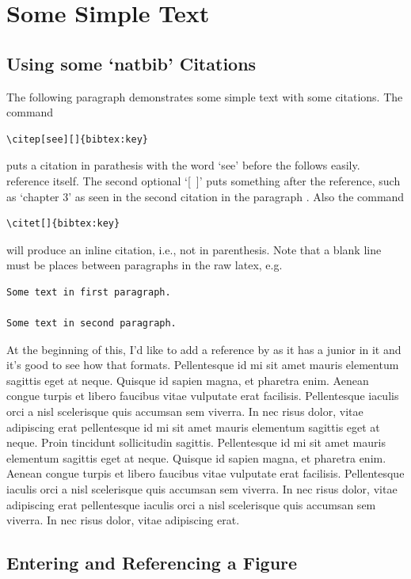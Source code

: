 \chapter{Some Simple Text}

\section{Using some `natbib' Citations}

The following paragraph demonstrates some simple text with some citations. The
command
\begin{verbatim}
\citep[see][]{bibtex:key}
\end{verbatim}
puts a citation in parathesis with the word `see' before the follows easily.
reference itself. The second optional `[~]' puts something after the reference,
such as `chapter 3' as seen \cite{Glover.2012} in the second citation in the paragraph \cite{Grainger.1994}. Also the
command \cite{Jenkins.2000}
\begin{verbatim}
\citet[]{bibtex:key}
\end{verbatim}
will produce an inline citation, i.e., not in parenthesis. Note that a blank
line must be places between paragraphs in the raw latex, e.g.
\begin{verbatim}
Some text in first paragraph.

Some text in second paragraph.
\end{verbatim}

At the beginning of this, I'd like to add a reference by
as it has a junior in it and it's good to see how that formats. Pellentesque id
mi sit amet mauris elementum sagittis eget at neque. Quisque id sapien magna, et
pharetra enim. Aenean congue turpis et libero faucibus vitae vulputate erat
facilisis. Pellentesque iaculis orci a nisl scelerisque quis accumsan sem
viverra. In nec risus dolor, vitae adipiscing erat
pellentesque id mi sit amet mauris elementum 
sagittis eget at neque. Proin tincidunt sollicitudin sagittis. Pellentesque id
mi sit amet mauris elementum sagittis eget at neque. Quisque id sapien magna, et
pharetra enim. Aenean congue turpis et libero faucibus vitae vulputate erat
facilisis. Pellentesque iaculis orci a nisl scelerisque quis accumsan sem
viverra. In nec risus dolor, vitae adipiscing erat
pellentesque iaculis orci a nisl scelerisque
quis accumsan sem viverra. In nec risus dolor, vitae adipiscing erat.

\section{Entering and Referencing a Figure}

